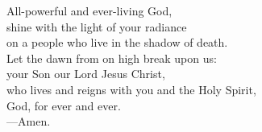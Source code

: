 \prayer


\begin{prayerverse}
All-powerful and ever-living God,\\
shine with the light of your radiance\\
on a people who live in the shadow of death.\\
Let the dawn from on high break upon us:\\
your Son our Lord Jesus Christ,\\
who lives and reigns with you and the Holy Spirit,\\
God, for ever and ever.\\
{\color{red}---\thinspace}Amen.
\end{prayerverse}

